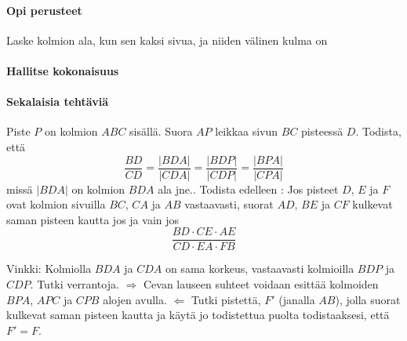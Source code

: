 
\begin{tehtavasivu}
\paragraph*{Opi perusteet}

\begin{tehtava}
Laske kolmion ala, kun sen kaksi sivua, ja niiden välinen kulma on
\begin{alakohdat}
\end{alakohdat}
\begin{vastaus}
\begin{alakohdat}
\end{alakohdat}
\end{vastaus}
\end{tehtava}


\paragraph*{Hallitse kokonaisuus}

\paragraph*{Sekalaisia tehtäviä}

\begin{tehtava}
Piste $P$ on kolmion $ABC$ sisällä. Suora $AP$ leikkaa sivun $BC$ pisteessä $D$. Todista, että
\[
\frac{BD}{CD} = \frac{|BDA|}{|CDA|} = \frac{|BDP|}{|CDP|} = \frac{|BPA|}{|CPA|}
\]
missä $|BDA|$ on kolmion $BDA$ ala jne.. Todista edelleen : Jos pisteet $D$, $E$ ja $F$ ovat kolmion sivuilla $BC$, $CA$ ja $AB$ vastaavasti, suorat $AD$, $BE$ ja $CF$ kulkevat saman pisteen kautta jos ja vain jos
\[
\frac{BD\cdot CE \cdot AE}{CD \cdot EA \cdot FB}
\]
\begin{vastaus}
Vinkki: Kolmiolla $BDA$ ja $CDA$ on sama korkeus, vastaavasti kolmioilla $BDP$ ja $CDP$. Tutki verrantoja. $\Rightarrow$ Cevan lauseen suhteet voidaan esittää kolmoiden $BPA$, $APC$ ja $CPB$ alojen avulla. $\Leftarrow$ Tutki pistettä, $F'$ (janalla $AB$), jolla suorat kulkevat saman pisteen kautta ja käytä jo todistettua puolta todistaaksesi, että $F' = F$.
\end{vastaus}
\end{tehtava}
\end{tehtavasivu}

